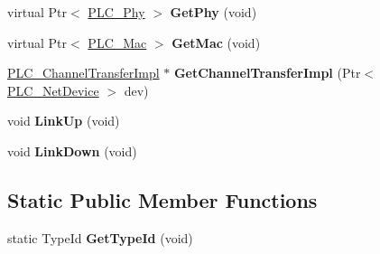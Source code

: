 \begin{DoxyCompactItemize}
\item 
\hypertarget{classns3_1_1PLC__NetDevice_adf90ef3a1b0fdc23eb87baa24fc2ac9c}{virtual \-Ptr$<$ \hyperlink{classns3_1_1PLC__Phy}{\-P\-L\-C\-\_\-\-Phy} $>$ {\bfseries \-Get\-Phy} (void)}\label{classns3_1_1PLC__NetDevice_adf90ef3a1b0fdc23eb87baa24fc2ac9c}

\item 
\hypertarget{classns3_1_1PLC__NetDevice_a8a5c24752737a1c9b7db33756570eafc}{virtual \-Ptr$<$ \hyperlink{classns3_1_1PLC__Mac}{\-P\-L\-C\-\_\-\-Mac} $>$ {\bfseries \-Get\-Mac} (void)}\label{classns3_1_1PLC__NetDevice_a8a5c24752737a1c9b7db33756570eafc}

\item 
\hypertarget{classns3_1_1PLC__NetDevice_a4d65dbc8244983c8e926e4b1301e6cc1}{\hyperlink{classns3_1_1PLC__ChannelTransferImpl}{\-P\-L\-C\-\_\-\-Channel\-Transfer\-Impl} $\ast$ {\bfseries \-Get\-Channel\-Transfer\-Impl} (\-Ptr$<$ \hyperlink{classns3_1_1PLC__NetDevice}{\-P\-L\-C\-\_\-\-Net\-Device} $>$ dev)}\label{classns3_1_1PLC__NetDevice_a4d65dbc8244983c8e926e4b1301e6cc1}

\item 
\hypertarget{classns3_1_1PLC__NetDevice_a5a921f61ca06ec6ee859302e62210486}{void {\bfseries \-Link\-Up} (void)}\label{classns3_1_1PLC__NetDevice_a5a921f61ca06ec6ee859302e62210486}

\item 
\hypertarget{classns3_1_1PLC__NetDevice_a7e9d4b7f3700cbe993ed9d8f4e18bfcb}{void {\bfseries \-Link\-Down} (void)}\label{classns3_1_1PLC__NetDevice_a7e9d4b7f3700cbe993ed9d8f4e18bfcb}

\end{DoxyCompactItemize}
\subsection*{\-Static \-Public \-Member \-Functions}
\begin{DoxyCompactItemize}
\item 
\hypertarget{classns3_1_1PLC__NetDevice_a2314182a29ea70bd44e868b143c68602}{static \-Type\-Id {\bfseries \-Get\-Type\-Id} (void)}\label{classns3_1_1PLC__NetDevice_a2314182a29ea70bd44e868b143c68602}

\end{DoxyCompactItemize}
